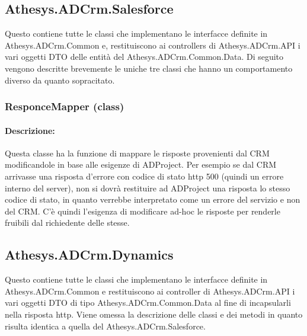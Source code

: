 \subsection{Athesys.ADCrm.Salesforce}\label{salesforce}
Questo  contiene tutte le classi che implementano le interfacce definite in Athesys.ADCrm.Common e, restituiscono ai controllers di Athesys.ADCrm.API i vari oggetti \gls{DTO} delle entità del  Athesys.ADCrm.Common.Data.
Di seguito vengono descritte brevemente le uniche tre classi che hanno un comportamento diverso da quanto sopracitato.

\subsubsection{ResponceMapper (class)}\label{responceMapperClass}
\paragraph{Descrizione:}
Questa classe ha la funzione di mappare le risposte provenienti dal \gls{CRM} modificandole in base alle esigenze di ADProject.
Per esempio se dal \gls{CRM} arrivasse una risposta d'errore con codice di stato \gls{http} 500 (quindi un errore interno del server), non si dovrà restituire ad ADProject una risposta lo stesso codice di stato, in quanto verrebbe interpretato come un errore del servizio e non del \gls{CRM}. C'è quindi l'esigenza di modificare ad-hoc le risposte per renderle fruibili dal richiedente delle stesse.

\subsection{Athesys.ADCrm.Dynamics}\label{dynamics}
Questo  contiene tutte le classi che implementano le interfacce definite in Athesys.ADCrm.Common e restituiscono ai controller di Athesys.ADCrm.API i vari oggetti \gls{DTO} di tipo Athesys.ADCrm.Common.Data al fine di incapsularli nella risposta \gls{http}.
Viene omessa la descrizione delle classi e dei metodi in quanto risulta identica a quella del  Athesys.ADCrm.Salesforce.


